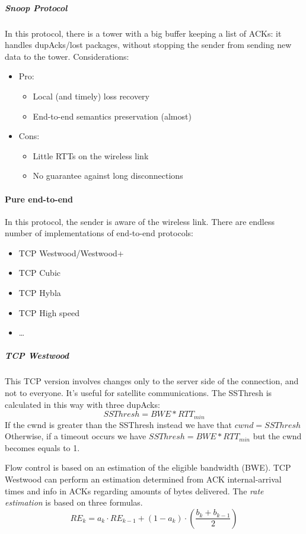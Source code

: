 \subparagraph*{Snoop Protocol} In this protocol, there is a tower with a big
buffer keeping a list of ACKs: it handles dupAcks/lost packages, without
stopping the sender from sending new data to the tower.
Considerations:
\begin{itemize}
\item Pro:
  \begin{itemize}
  \item Local (and timely) loss recovery
  \item End-to-end semantics preservation (almost)
  \end{itemize}
\item Cons:
  \begin{itemize}
  \item Little RTTs on the wireless link
  \item No guarantee against long disconnections
  \end{itemize}
\end{itemize}

\paragraph*{Pure end-to-end} In this protocol, the sender is aware of the wireless
link. There are endless number of implementations of end-to-end protocols:
\begin{itemize}
\item TCP Westwood/Westwood+
\item TCP Cubic
\item TCP Hybla
\item TCP High speed
\item \dots
\end{itemize}

\subparagraph*{TCP Westwood} This TCP version involves changes only to the
server side of the connection, and not to everyone. It's useful for satellite
communications.
The SSThresh is calculated in this way with three dupAcks:
\begin{equation}
SSThresh = BWE * RTT_{min}
\end{equation}
If the cwnd is greater than the SSThresh instead we have that $cwnd=SSThresh$
Otherwise, if a timeout occurs we have $SSThresh = BWE * RTT_{min}$ but the
cwnd becomes equals to 1.

Flow control is based on an estimation of the eligible bandwidth (BWE). TCP
Westwood can perform an estimation determined from ACK internal-arrival times
and info in ACKs regarding amounts of bytes delivered. The \textit{rate
  estimation} is based on three formulas.
\begin{equation}
  RE_k = a_k \cdot RE_{k-1} + (1 - a_k) \cdot \left( \frac{b_k + b_{k-1}}{2}
\right)
\end{equation}

